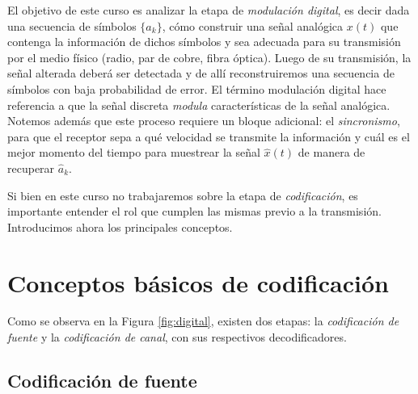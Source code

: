 El objetivo de este curso es analizar la etapa de \emph{modulación digital}, es decir dada una secuencia de símbolos $\{a_k\}$, cómo construir una señal analógica $x(t)$ que contenga la información de dichos símbolos y sea adecuada para su transmisión por el medio físico (radio, par de cobre, fibra óptica). Luego de su transmisión, la señal alterada deberá ser detectada y de allí reconstruiremos una secuencia de símbolos con baja probabilidad de error. El término modulación digital hace referencia a que la señal discreta \emph{modula} características de la señal analógica. Notemos además que este proceso requiere un bloque adicional: el \emph{sincronismo}, para que el receptor sepa a qué velocidad se transmite la información y cuál es el mejor momento del tiempo para muestrear la señal $\hat{x}(t)$ de manera de recuperar $\hat{a}_k$.

Si bien en este curso no trabajaremos sobre la etapa de \emph{codificación}, es importante entender el rol que cumplen las mismas previo a la transmisión. Introducimos ahora los principales conceptos.

\section{Conceptos básicos de codificación}

Como se observa en la Figura \ref{fig:digital}, existen dos etapas: la \emph{codificación de fuente} y la \emph{codificación de canal}, con sus respectivos decodificadores.

\subsection{Codificación de fuente}

